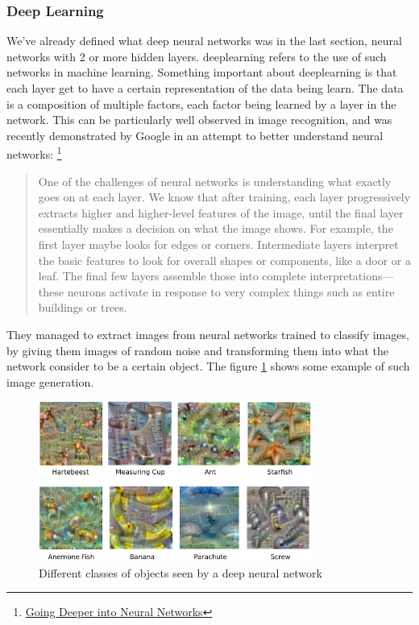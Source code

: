 \documentclass[12pt]{article}
\begin{document}
\subsubsection{Deep Learning}

We've already defined what deep neural networks was in the last section, neural
networks with 2 or more hidden layers. \gls{deeplearning} refers to the use of such
networks in machine learning. Something important about \gls{deeplearning} is that
each layer get to have a certain representation of the data being learn. The
data is a composition of multiple factors, each factor being learned by a layer
in the  network. This can be particularly well observed in image recognition,
and was  recently demonstrated by Google in an attempt to better understand
neural networks:
\footnote{\href{http://googleresearch.blogspot.co.uk/2015/06/inceptionism-going-deeper-into-neural.html}
{Going Deeper into Neural Networks}}

\begin{quote}
  One of the challenges of neural networks is understanding what exactly goes on
  at each layer. We know that after training, each layer progressively extracts
  higher and higher-level features of the image, until the final layer
  essentially makes a decision on what the image shows. For example, the first
  layer maybe looks for edges or corners. Intermediate layers interpret the
  basic features to look for overall shapes or components, like a door or a
  leaf. The final few layers assemble those into complete interpretations—these
  neurons activate in response to very complex things such as entire buildings
  or trees.
\end{quote}

They managed to extract images from neural networks trained to classify images, by
giving them images of random noise and transforming them into what the network
consider to be a certain object. The figure \ref{fig:classvis} shows some example of
such image generation.

\begin{figure}[ht]
    \centering
    \includegraphics[width=0.8\textwidth]{classvis}
    \caption{Different classes of objects seen by a deep neural network}
    \label{fig:classvis}
\end{figure}
\end{document}
